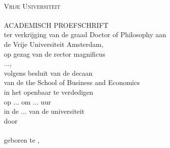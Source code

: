 \thispagestyle{empty}
\begin{center}
\textsc{ }\\[1em]
\textsc{Vrije Universiteit}\\[8em]

{\Huge \textbf{\BookTitle}} \\[8em]

\textsc{ACADEMISCH PROEFSCHRIFT}\\[1em]
ter verkrijging van de graad Doctor of Philosophy aan\\
de Vrije Universiteit Amsterdam, \\
op gezag van de rector magnificus \\
...,\\
volgens besluit van de decaan\\
van de the School of Business and Economics\\
in het openbaar te verdedigen\\
op ... om ... uur\\
in de ... van de universiteit\\[8em]

door\\[1em]
\BookAuthor \\[1em]
geboren te \BirthCityAuthor, \BirthCountryAuthor
\end{center}

\clearpage